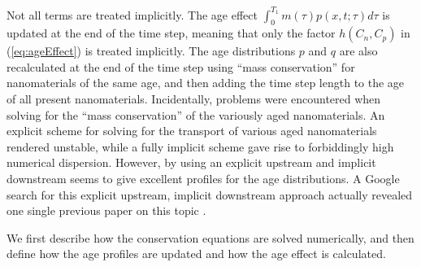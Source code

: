 \documentclass[energies,article,submit,moreauthors,pdftex]{Definitions/mdpi}
\begin{document}
Not all terms are treated implicitly. The age effect $\int^{T_1}_{0}m(\tau)p(x,t;\tau)d\tau$ is updated at the end of the time step, meaning that only the factor $h(C_n,C_p)$ in (\ref{eq:ageEffect}) is treated implicitly. The age distributions $p$ and $q$ are also recalculated at the end of the time step using “mass conservation” for nanomaterials of the same age, and then adding the time step length to the age of all present nanomaterials. Incidentally, problems were encountered when solving for the “mass conservation” of the variously aged nanomaterials.  An explicit scheme for solving for the transport of various aged nanomaterials rendered unstable, while a fully implicit scheme gave rise to forbiddingly high numerical dispersion. However, by using an explicit upstream and implicit downstream seems to give excellent profiles for the age distributions. A Google search for this explicit upstream, implicit downstream approach actually revealed one single previous paper on this topic \citep{Flatten2008}. 

We first describe how the conservation equations are solved numerically, and then define how the age profiles are updated and how the age effect is calculated.
\end{document}
